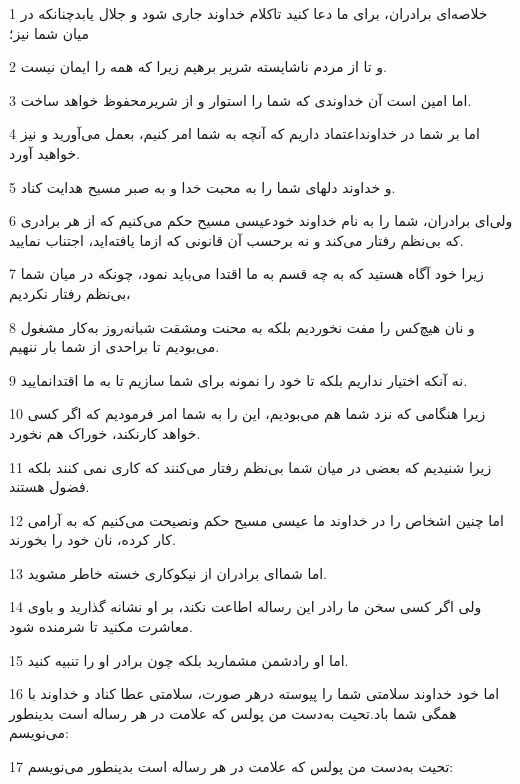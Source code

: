 \par 1 خلاصه‌ای برادران، برای ما دعا کنید تاکلام خداوند جاری شود و جلال یابدچنانکه در میان شما نیز؛
\par 2 و تا از مردم ناشایسته شریر برهیم زیرا که همه را ایمان نیست.
\par 3 اما امین است آن خداوندی که شما را استوار و از شریرمحفوظ خواهد ساخت.
\par 4 اما بر شما در خداونداعتماد داریم که آنچه به شما امر کنیم، بعمل می‌آورید و نیز خواهید آورد.
\par 5 و خداوند دلهای شما را به محبت خدا و به صبر مسیح هدایت کناد.
\par 6 ولی‌ای برادران، شما را به نام خداوند خودعیسی مسیح حکم می‌کنیم که از هر برادری که بی‌نظم رفتار می‌کند و نه برحسب آن قانونی که ازما یافته‌اید، اجتناب نمایید.
\par 7 زیرا خود آگاه هستید که به چه قسم به ما اقتدا می‌باید نمود، چونکه در میان شما بی‌نظم رفتار نکردیم،
\par 8 و نان هیچ‌کس را مفت نخوردیم بلکه به محنت ومشقت شبانه‌روز به‌کار مشغول می‌بودیم تا براحدی از شما بار ننهیم.
\par 9 نه آنکه اختیار نداریم بلکه تا خود را نمونه برای شما سازیم تا به ما اقتدانمایید.
\par 10 زیرا هنگامی که نزد شما هم می‌بودیم، این را به شما امر فرمودیم که اگر کسی خواهد کارنکند، خوراک هم نخورد.
\par 11 زیرا شنیدیم که بعضی در میان شما بی‌نظم رفتار می‌کنند که کاری نمی کنند بلکه فضول هستند.
\par 12 اما چنین اشخاص را در خداوند ما عیسی مسیح حکم ونصیحت می‌کنیم که به آرامی کار کرده، نان خود را بخورند.
\par 13 اما شما‌ای برادران از نیکوکاری خسته خاطر مشوید.
\par 14 ولی اگر کسی سخن ما رادر این رساله اطاعت نکند، بر او نشانه گذارید و باوی معاشرت مکنید تا شرمنده شود.
\par 15 اما او رادشمن مشمارید بلکه چون برادر او را تنبیه کنید.
\par 16 اما خود خداوند سلامتی شما را پیوسته درهر صورت، سلامتی عطا کناد و خداوند با همگی شما باد.تحیت به‌دست من پولس که علامت در هر رساله است بدینطور می‌نویسم:
\par 17 تحیت به‌دست من پولس که علامت در هر رساله است بدینطور می‌نویسم:



